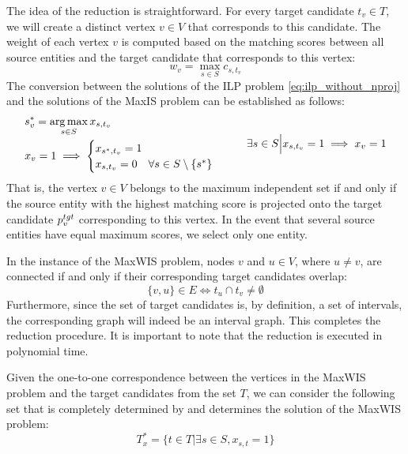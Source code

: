 The idea of the reduction is straightforward. For every target candidate
\( t_v \in T \), we will create a distinct vertex \( v \in V \) that corresponds
to this candidate. The weight of each vertex \( v \) is computed based on the matching
scores between all source entities and the target candidate that corresponds to this
vertex:
\[
  w_v = \max\limits_{s \in S} c_{s, t_v}
\]
The conversion between the solutions of the ILP problem \eqref{eq:ilp_without_nproj} and
the solutions of the MaxIS problem can be established as follows:
\begin{equation} \label{eq:link_variables}
  \begin{aligned}
    &s^*_v = \operatorname*{arg\,max}\limits_{s \in S} x_{s, t_v} \\
    &
    x_v = 1 \implies
    \begin{cases}
      x_{s^*, t_v} = 1 \\
      x_{s, t_v} = 0 \quad \forall s \in S \setminus \{ s^* \} \\
    \end{cases}
  \end{aligned}
  \qquad
  \exists s \in S \Big| x_{s, t_v} = 1 \implies
  x_v = 1
\end{equation}
That is, the vertex \( v \in V \) belongs to the maximum independent set if and only
if the source entity with the highest matching score is projected onto the target
candidate \( p_v^{tgt} \) corresponding to this vertex. In the event that several source
entities have equal maximum scores, we select only one entity.

In the instance of the MaxWIS problem, nodes \( v \) and \( u \in V \), where \( u \neq v \),
are connected if and only if their corresponding target candidates overlap:
\begin{equation} \label{eq:edge_reduction}
  \{ v, u \} \in E \Leftrightarrow t_u \cap t_v \neq \emptyset
\end{equation}
Furthermore, since the set of target candidates is, by definition, a set of intervals,
the corresponding graph will indeed be an interval graph.
This completes the reduction procedure. It is important to note that the reduction
is executed in polynomial time.

Given the one-to-one correspondence between the vertices in the MaxWIS problem and
the target candidates from the set \( T \), we can consider the following set that
is completely determined by and determines the solution of the MaxWIS problem:
\[
  T^*_{x} = \{ t \in T | \exists s \in S, x_{s, t} = 1 \}
\]

